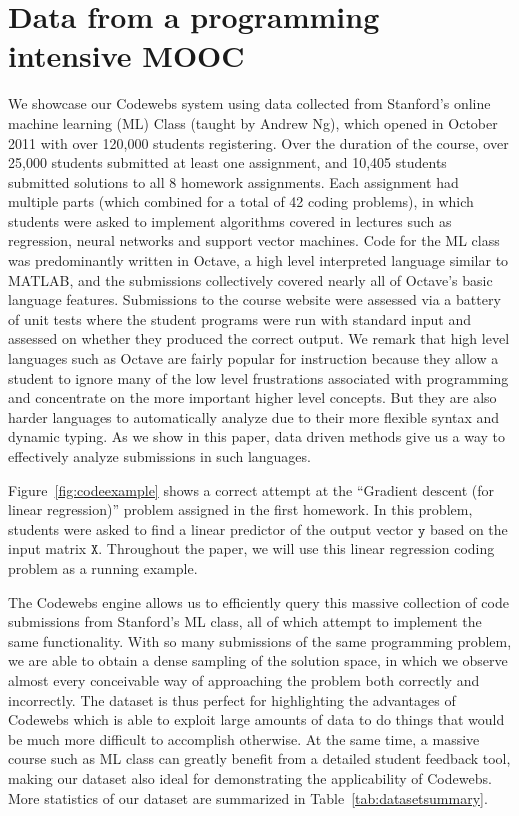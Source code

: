 \section{Data from a programming intensive MOOC}\label{sec:dataset}
We showcase our Codewebs system using data collected from 
Stanford's online machine learning (ML) Class (taught by Andrew Ng), 
which opened in October 2011 with over 
120,000 students registering. Over the duration of the course,
over 25,000 students submitted at least one assignment, and 
10,405 students submitted solutions to all 8 homework assignments.  Each
assignment had multiple parts (which combined for a total of 42 
coding problems), in which students were asked to implement algorithms covered in lectures such as regression, neural networks and support vector machines.
Code for the ML class was predominantly written in Octave, a high level interpreted language similar to MATLAB,
and the submissions collectively covered nearly all of Octave's basic language features.
Submissions to the course website were assessed via a battery of unit tests where the student
programs were run with standard input and assessed on whether they produced
the correct output. 
We remark that high level languages such as Octave are fairly popular for instruction because they
allow a student to ignore many of the low level frustrations associated with programming and 
concentrate on the more important higher level concepts.
But they are also harder languages to automatically analyze due to their more flexible syntax and dynamic typing.
As we show in this paper, data driven methods give us a way to effectively analyze submissions in such languages.

 Figure~\ref{fig:codeexample} shows a correct attempt at the ``Gradient descent (for linear regression)'' problem
assigned in the first homework.  In this problem, students were asked to find a linear predictor of the output vector $\texttt{y}$
based on the input matrix $\texttt{X}$. Throughout the paper, we will use this linear regression coding problem as a running example.

 The Codewebs engine allows us to efficiently query this massive collection of code 
submissions from Stanford's ML class, all of which attempt to implement the same functionality.  With so many submissions of the same 
programming problem, we are able to obtain a dense sampling of the solution space, in which 
 we observe almost every conceivable way of approaching the problem both correctly and incorrectly.
The dataset is thus perfect for highlighting the advantages of Codewebs which is able to exploit large amounts of data to do things 
that would be much more difficult to accomplish otherwise.
At the same time, a massive course such as ML class can greatly benefit from a detailed student feedback tool, 
making our dataset also ideal for demonstrating the applicability of Codewebs.
More statistics of our dataset are summarized in Table~\ref{tab:datasetsummary}.

